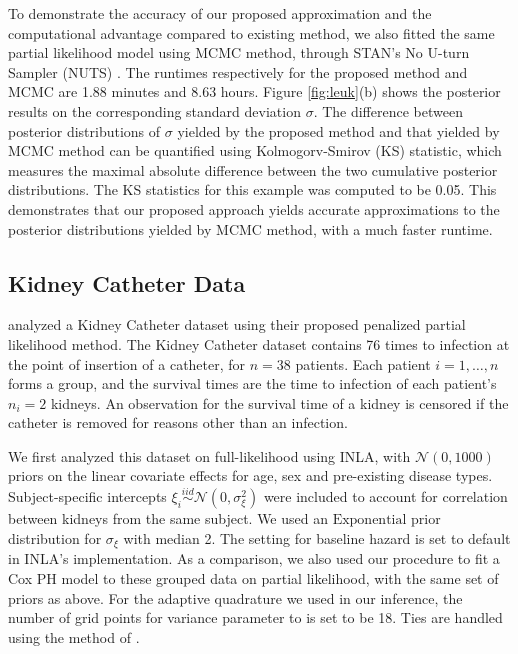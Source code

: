 \documentclass[ba]{imsart}
\begin{document}
To demonstrate the accuracy of our proposed approximation and the computational advantage compared to existing method, we also fitted the same partial likelihood model using MCMC method, through STAN's No U-turn Sampler (NUTS) \citep{NUTS}. The runtimes respectively for the proposed method and MCMC are 1.88 minutes and 8.63 hours. Figure \ref{fig:leuk}(b) shows the posterior results on the corresponding standard deviation $\sigma$. The difference between posterior distributions of $\sigma$ yielded by the proposed method and that yielded by MCMC method can be quantified using Kolmogorv-Smirov (KS) statistic, which measures the maximal absolute difference between the two cumulative posterior distributions. The KS statistics for this example was computed to be 0.05. This demonstrates that our proposed approach yields accurate approximations to the posterior distributions yielded by MCMC method, with a much faster runtime.




\subsection{Kidney Catheter Data}\label{subsec:kidney}

\cite{freqPL} analyzed a Kidney Catheter dataset using their proposed penalized partial likelihood method. The Kidney Catheter dataset contains 76 times to infection at the point of insertion of a catheter, for $n = 38$ patients. Each patient $i=1,\ldots,n$ forms a group, and the survival times are the time to infection of each patient's $n_{i} = 2$ kidneys. An observation for the survival time of a kidney is censored if the catheter is removed for reasons other than an infection. 

We first analyzed this dataset on full-likelihood using INLA, with $\mathcal{N}(0, 1000)$ priors on the linear covariate effects for age, sex and pre-existing disease types. Subject-specific intercepts $\xi_{i}\overset{iid}{\sim}\mathcal{N}(0,\sigma^{2}_{\xi})$ were included to account for correlation between kidneys from the same subject. We used an $\text{Exponential}$ prior distribution for $\sigma_{\xi}$ with median 2. The setting for baseline hazard is set to default in INLA's implementation. As a comparison, we also used our procedure to fit a Cox PH model to these grouped data on partial likelihood, with the same set of priors as above. For the adaptive quadrature we used in our inference, the number of grid points for variance parameter to is set to be 18. Ties are handled using the method of \cite{Breslow}.
\end{document}
